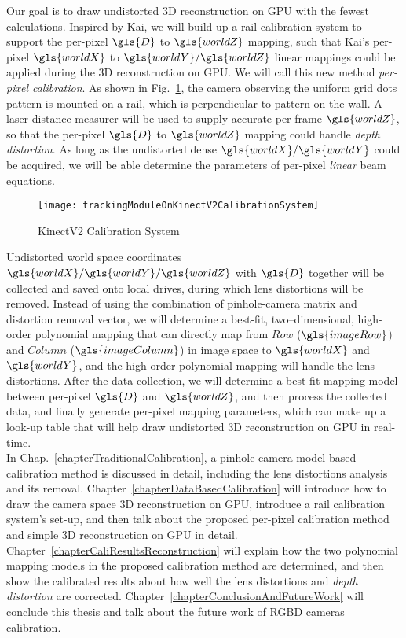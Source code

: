 Our goal is to draw undistorted \gls{3D} reconstruction on \gls{GPU} with the fewest calculations. Inspired by Kai, we will build up a rail calibration system to support the per-pixel \(\gls{D}\) to \(\gls{worldZ}\) mapping, such that Kai's per-pixel \(\gls{worldX}\) to \(\gls{worldY}/\gls{worldZ}\) linear mappings could be applied during the \gls{3D} reconstruction on \gls{GPU}. We will call this new method \textit{per-pixel calibration}. As shown in Fig.~\ref{trackingModuleOnKinectV2CalibrationSystem}, the camera observing the uniform grid dots pattern is mounted on a rail, which is perpendicular to pattern on the wall. A laser distance measurer will be used to supply accurate per-frame \(\gls{worldZ}\), so that the per-pixel \(\gls{D}\) to \(\gls{worldZ}\) mapping could handle \emph{depth distortion}. As long as the undistorted dense \(\gls{worldX}/\gls{worldY}\) could be acquired, we will be able determine the parameters of per-pixel \emph{linear} beam equations.
\\\indent
\begin{figure}[t]
\centering
\texttt{[image: trackingModuleOnKinectV2CalibrationSystem]}
\caption{\gls{KinectV2} Calibration System}
\label{trackingModuleOnKinectV2CalibrationSystem}
\end{figure}%
Undistorted world space coordinates \(\gls{worldX}/\gls{worldY}/\gls{worldZ}\) with \(\gls{D}\) together will be collected and saved onto local drives, during which lens distortions will be removed. Instead of using the combination of pinhole-camera matrix and distortion removal vector, we will determine a best-fit, two--dimensional, high-order polynomial mapping that can directly map from \(Row\) (\(\gls{imageRow}\)) and \(Column\) (\(\gls{imageColumn}\)) in image space to \(\gls{worldX}\) and \(\gls{worldY}\), and the high-order polynomial mapping will handle the lens distortions. After the data collection, we will determine a best-fit mapping model between per-pixel \(\gls{D}\) and \(\gls{worldZ}\), and then process the collected data, and finally generate per-pixel mapping parameters, which can make up a look-up table that will help draw undistorted \gls{3D} reconstruction on \gls{GPU} in real-time.
\\\indent
In Chap.~\ref{chapterTraditionalCalibration}, a pinhole-camera-model based calibration method is discussed in detail, including the lens distortions analysis and its removal. Chapter~\ref{chapterDataBasedCalibration} will introduce how to draw the camera space \gls{3D} reconstruction on \gls{GPU}, introduce a rail calibration system's set-up, and then talk about the proposed per-pixel calibration method and simple \gls{3D} reconstruction on \gls{GPU} in detail. Chapter~\ref{chapterCaliResultsReconstruction} will explain how the two polynomial mapping models in the proposed calibration method are determined, and then show the calibrated results about how well the lens distortions and \emph{depth distortion} are corrected. Chapter~\ref{chapterConclusionAndFutureWork} will conclude this thesis and talk about the future work of \gls{RGBD} cameras calibration.
